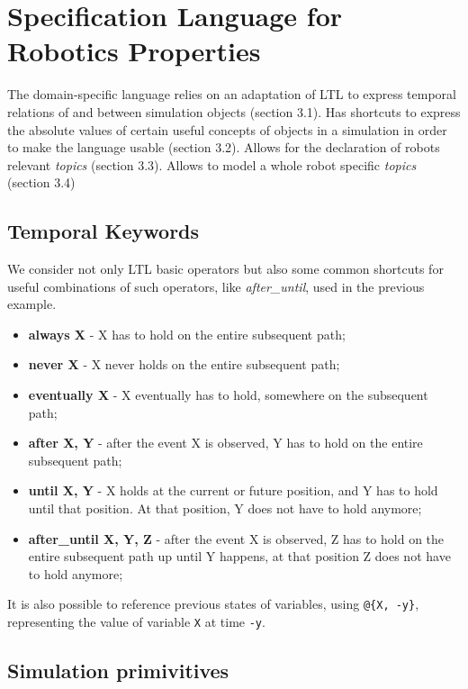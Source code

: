 \documentclass[runningheads]{llncs}
\begin{document}
\section{Specification Language for Robotics Properties}

The domain-specific language relies on an adaptation of LTL to express temporal relations of and between simulation objects (section 3.1). Has shortcuts to express the absolute values of certain useful concepts of objects in a simulation in order to make the language usable (section 3.2). Allows for the declaration of robots relevant \textit{topics} (section 3.3). Allows to model a whole robot specific \textit{topics} (section 3.4)

\subsection{Temporal Keywords}

We consider not only LTL basic operators but also some common shortcuts for useful combinations of such operators, like \textit{after\_until}, used in the previous example.

\begin{itemize}
\item {\bfseries always X} - X has to hold on the entire subsequent path;
\item {\bfseries never X} - X never holds on the entire subsequent path;
\item {\bfseries eventually X} - X eventually has to hold, somewhere on the subsequent path;
\item {\bfseries after X, Y} - after the event X is observed, Y has to hold on the entire subsequent path;
\item {\bfseries until X, Y} - X holds at the current or future position, and Y has to hold until that position. At that position, Y does not have to hold anymore;
\item {\bfseries after\_until X, Y, Z} - after the event X is observed, Z has to hold on the entire subsequent path up until Y happens, at that position Z does not have to hold anymore;
\end{itemize}

\noindent It is also possible to reference previous states of variables, using \lstinline|@{X, -y}|, representing the value of variable \lstinline|X| at time \lstinline|-y|.

\subsection{Simulation primivitives}
\end{document}
